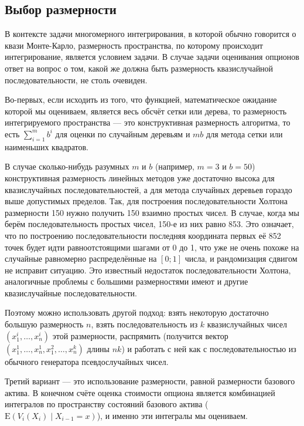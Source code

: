 \documentclass[specialist,
               substylefile = ../spbu.rtx,
               subf,href,colorlinks=true, 12pt]{disser}
\newcommand{\E}{\mathrm{E}}
\begin{document}

\subsection{Выбор размерности} %
\label{sub:choice_of_dimension}

В контексте задачи многомерного интегрирования, в которой обычно говорится о квази Монте-Карло, размерность пространства, по которому происходит интегрирование, является условием задачи. В случае задачи оценивания опционов ответ на вопрос о том, какой же должна быть размерность квазислучайной последовательности, не столь очевиден.

Во-первых, если исходить из того, что функцией, математическое ожидание которой мы оцениваем, является весь обсчёт сетки или дерева, то размерность интегрируемого пространства --- это конструктивная размерность алгоритма, то есть $\sum_{i=1}^m b^i$ для оценки по случайным деревьям и $mb$ для метода сетки или наименьших квадратов.

В случае сколько-нибудь разумных $m$ и $b$ (например, $m = 3$ и $b = 50$) конструктивная размерность линейных методов уже достаточно высока для квазислучайных последовательностей, а для метода случайных деревьев гораздо выше допустимых пределов. Так, для построения последовательности Холтона размерности 150 нужно получить 150 взаимно простых чисел. В случае, когда мы берём последовательность простых чисел, 150-е из них равно 853. Это означает, что по построению последовательности последняя координата первых её 852 точек будет идти равноотстоящими шагами от 0 до 1, что уже не очень похоже на случайные равномерно распределённые на $\left[0; 1\right]$ числа, и рандомизация сдвигом не исправит ситуацию. Это известный недостаток последовательности Холтона, аналогичные проблемы с большими размерностями имеют и другие квазислучайные последовательности.

Поэтому можно использовать другой подход: взять некоторую достаточно большую размерность $n$, взять последовательность из $k$ квазислучайных чисел $\left(x_1^i, \dots, x_n^i\right)$  этой размерности, распрямить (получится вектор $\left(x_1^1, \dots, x_n^1, x_1^2, \dots, x_n^k\right)$ длины $nk$) и работать с ней как с последовательностью из обычного генератора псевдослучайных чисел.

Третий вариант --- это использование размерности, равной размерности базового актива. В конечном счёте оценка стоимости опциона является комбинацией интегралов по пространству состояний базового актива ($\E\left(V_i(X_i)\middle\vert X_{i-1} = x\right)$), и именно эти интегралы мы оцениваем.
\end{document}

